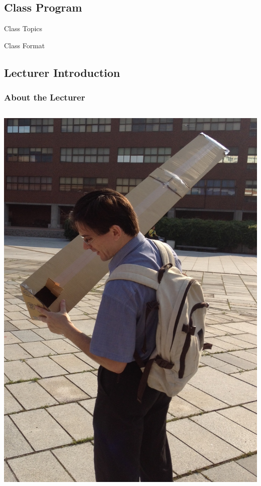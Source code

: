 \subsection{Class Program}
\begin{frame}{Class Topics}
\end{frame}

\begin{frame}{Class Format}
\end{frame}

\subsection{Lecturer Introduction}
\begin{frame}
  \frametitle{About the Lecturer}
  \begin{columns}
    \includegraphics[width=1\textwidth]{../img/pinhole}

\end{columns}
\end{frame}
